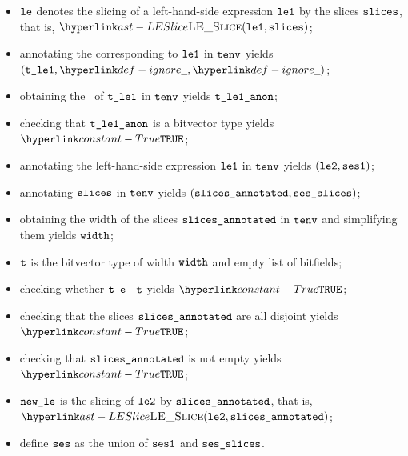 \ProseParagraph
\AllApply
\begin{itemize}
  \item $\texttt{le}$ denotes the slicing of a left-hand-side expression $\texttt{le1}$ by the slices $\texttt{slices}$, that is, $\LESlice(\vleone, \slices)$;
  \item annotating the \rhsexpression{} corresponding to $\texttt{le1}$ in $\texttt{tenv}$ yields \\
        $(\vtleone, \Ignore, \Ignore)$\ProseOrTypeError;
  \item obtaining the \underlyingtypeterm\ of $\texttt{t\_le1}$ in $\texttt{tenv}$ yields $\texttt{t\_le1\_anon}$\ProseOrTypeError;
  \item checking that $\texttt{t\_le1\_anon}$ is a bitvector type yields $\True$\ProseTerminateAs{\UnexpectedType};
  \item annotating the left-hand-side expression $\texttt{le1}$ in $\texttt{tenv}$ yields $(\texttt{le2}, \texttt{ses1})$\ProseOrTypeError;
  \item annotating $\texttt{slices}$ in $\texttt{tenv}$ yields $(\texttt{slices\_annotated}, \texttt{ses\_slices})$\ProseOrTypeError;
  \item obtaining the width of the slices $\texttt{slices\_annotated}$ in $\texttt{tenv}$ and simplifying them yields $\texttt{width}$;
  \item $\texttt{t}$ is the bitvector type of width $\texttt{width}$ and empty list of bitfields;
  \item checking whether $\texttt{t\_e}$ \typesatisfiesterm\ $\texttt{t}$ yields $\True$\ProseOrTypeError;
  \item checking that the slices $\texttt{slices\_annotated}$ are all disjoint yields $\True$\ProseOrTypeError;
  \item checking that $\texttt{slices\_annotated}$ is not empty yields $\True$\ProseTerminateAs{\BadSlices};
  \item $\texttt{new\_le}$ is the slicing of $\texttt{le2}$ by $\texttt{slices\_annotated}$, that is, $\LESlice(\vletwo, \slicesannotated)$;
  \item define $\texttt{ses}$ as the union of $\texttt{ses1}$ and $\texttt{ses\_slices}$.
\end{itemize}
\FormallyParagraph
